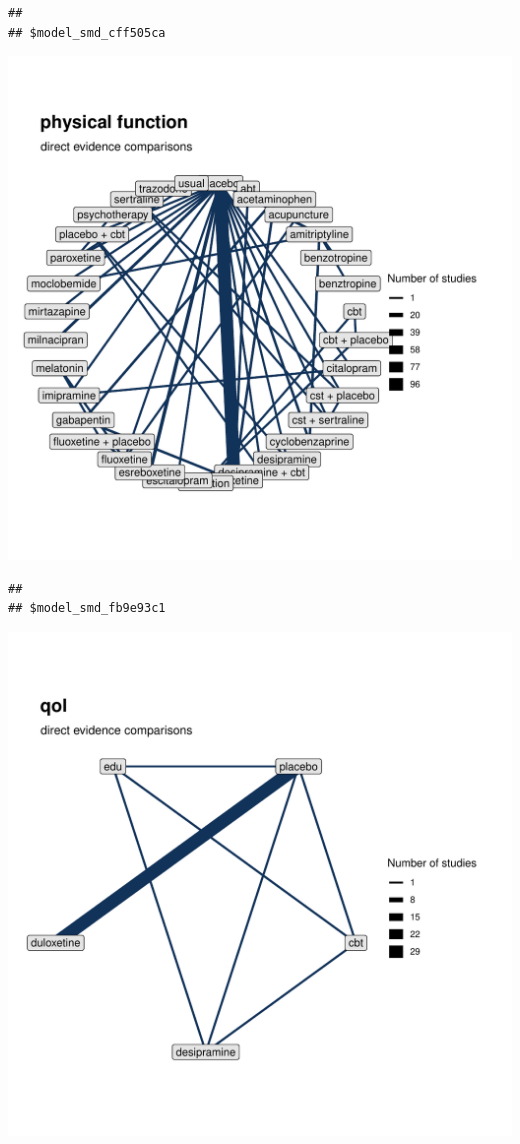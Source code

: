 \documentclass{article}\usepackage[]{graphicx}\usepackage[]{color}
\makeatletter
\newenvironment{kframe}{%
 \def\at@end@of@kframe{}%
 \ifinner\ifhmode%
  \def\at@end@of@kframe{\end{minipage}}%
  \begin{minipage}{\columnwidth}%
 \fi\fi%
 \def\FrameCommand##1{\hskip\@totalleftmargin \hskip-\fboxsep
 \colorbox{shadecolor}{##1}\hskip-\fboxsep
     \hskip-\linewidth \hskip-\@totalleftmargin \hskip\columnwidth}%
 \MakeFramed {\advance\hsize-\width
   \@totalleftmargin\z@ \linewidth\hsize
   \@setminipage}}%
 {\par\unskip\endMakeFramed%
 \at@end@of@kframe}
\newenvironment{knitrout}{}{} %
\makeatother
\begin{document}
\begin{knitrout}
\begin{kframe}\begin{verbatim}
## 
## $model_smd_cff505ca
\end{verbatim}
\end{kframe}
\includegraphics[width=\textwidth]{figure/networks-6} 
\begin{kframe}\begin{verbatim}
## 
## $model_smd_fb9e93c1
\end{verbatim}
\end{kframe}
\includegraphics[width=\textwidth]{figure/networks-7} 

\end{knitrout}
\end{document}

